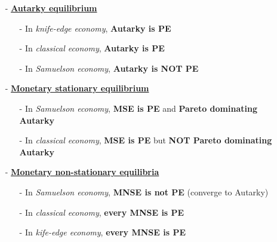 \documentclass[10pt,a4paper]{article}
\begin{document}
\begin{multicols*}{3}
\begin{center}
\end{center}

\begin{itemize}
    \item[-] \underline{\textbf{Autarky equilibrium}} 
    \begin{itemize}
        \item[-] In \textit{knife-edge economy}, \textbf{Autarky is PE}
        \item[-] In \textit{classical economy}, \textbf{Autarky is PE}
        \item[-] In \textit{Samuelson economy}, \textbf{Autarky is NOT PE}
    \end{itemize}
    
    \item[-] \underline{\textbf{Monetary stationary equilibrium}}
    \begin{itemize}
        \item[-] In \textit{Samuelson economy}, \textbf{MSE is PE} and \textbf{Pareto dominating Autarky}
        
        \item[-] In \textit{classical economy}, \textbf{MSE is PE} but \textbf{NOT Pareto dominating Autarky}
    \end{itemize}
    \item[-] \underline{\textbf{Monetary non-stationary equilibria}}
    \begin{itemize}
        \item[-] In \textit{Samuelson economy}, \textbf{MNSE is not PE} (converge to Autarky)
        
        \item[-] In \textit{classical economy}, \textbf{every MNSE is PE}
        
        \item[-] In \textit{kife-edge economy}, \textbf{every MNSE is PE}
    \end{itemize}
\end{itemize}


\end{multicols*}
\end{document}
